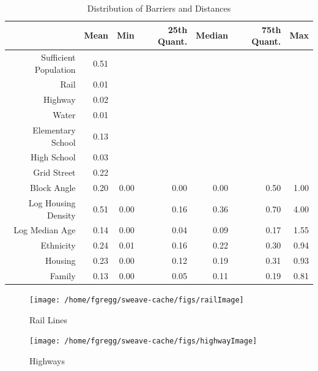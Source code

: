 \documentclass[12pt,letter]{article}\usepackage[]{graphicx}\usepackage[]{color}
\newenvironment{knitrout}{}{} %
\begin{document}
\begin{table}[ht]
\centering
\begin{tabular}{rrrrrrr}
  \hline
 & Mean & Min & 25th Quant. & Median & 75th Quant. & Max \\ 
  \hline
Sufficient Population & 0.51 &  &  &  &  &  \\ 
  Rail & 0.01 &  &  &  &  &  \\ 
  Highway & 0.02 &  &  &  &  &  \\ 
  Water & 0.01 &  &  &  &  &  \\ 
  Elementary School & 0.13 &  &  &  &  &  \\ 
  High School & 0.03 &  &  &  &  &  \\ 
  Grid Street & 0.22 &  &  &  &  &  \\ 
  Block Angle & 0.20 & 0.00 & 0.00 & 0.00 & 0.50 & 1.00 \\ 
  Log Housing Density & 0.51 & 0.00 & 0.16 & 0.36 & 0.70 & 4.00 \\ 
  Log Median Age & 0.14 & 0.00 & 0.04 & 0.09 & 0.17 & 1.55 \\ 
  Ethnicity & 0.24 & 0.01 & 0.16 & 0.22 & 0.30 & 0.94 \\ 
  Housing & 0.23 & 0.00 & 0.12 & 0.19 & 0.31 & 0.93 \\ 
  Family & 0.13 & 0.00 & 0.05 & 0.11 & 0.19 & 0.81 \\ 
   \hline
\end{tabular}
\caption{Distribution of Barriers and Distances} 
\label{tab:Distribution}
\end{table}



\begin{figure}
\begin{knitrout}
\color{fgcolor}

{\centering \texttt{[image: /home/fgregg/sweave-cache/figs/railImage]} 

}



\end{knitrout}

\caption{Rail Lines}
\end{figure}

\begin{figure}
\begin{knitrout}
\color{fgcolor}

{\centering \texttt{[image: /home/fgregg/sweave-cache/figs/highwayImage]} 

}



\end{knitrout}

\caption{Highways}
\end{figure}
\end{document}
